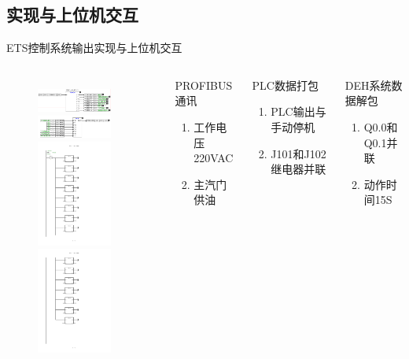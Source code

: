 \documentclass[12pt,hyperref={CJKbookmarks=true}]{beamer} %
\begin{document}
\subsection{实现与上位机交互}
\begin{frame}{ETS控制系统输出}{实现与上位机交互}
  		\begin{columns}
\begin{figure}
\includegraphics[angle=0,width=70pt,trim=0 0 0 0,clip]{picture/i.png}
\includegraphics[angle=0,width=70pt,trim=0 0 0 0,clip]{picture/q.png}\\
\includegraphics[angle=0,width=70pt,trim=0 50 50 50,clip]{picture/plc12.pdf}
\includegraphics[angle=0,width=70pt,trim=0 50 50 50,clip]{picture/plc13.pdf}
	
\end{figure}
\begin{block}{PROFIBUS通讯}
			\begin{enumerate}
				\item  工作电压220VAC
				\item  主汽门供油
				\end{enumerate}
\end{block}
\begin{exampleblock}{PLC数据打包}
			\begin{enumerate}
				\item PLC输出与手动停机
				\item J101和J102继电器并联
				\end{enumerate}
\end{exampleblock}
\begin{alertblock}{DEH系统数据解包}
				\begin{enumerate}
				\item Q0.0和Q0.1并联
				\item 动作时间15S
				\end{enumerate}
\end{alertblock}
		\end{columns}
	\end{frame}
\end{document}
